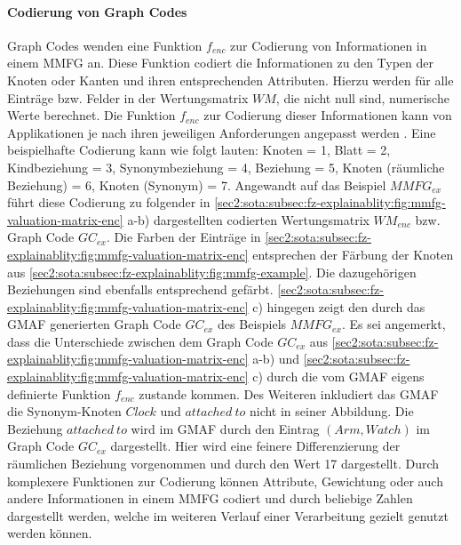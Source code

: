 \paragraph{Codierung von Graph Codes}
\label{sec2:sota:par:gc-encoding}
Graph Codes wenden eine Funktion $f_{enc}$ zur Codierung von Informationen in einem MMFG an.
Diese Funktion codiert die Informationen zu den Typen der Knoten oder Kanten und ihren entsprechenden Attributen.
Hierzu werden für alle Einträge bzw. Felder in der Wertungsmatrix $WM$, die nicht null sind, numerische Werte berechnet.
Die Funktion $f_{enc}$ zur Codierung dieser Informationen kann von Applikationen je nach ihren jeweiligen Anforderungen angepasst werden \cite{gc-2d-proj-mmfg}.
Eine beispielhafte Codierung kann wie folgt lauten: Knoten = 1, Blatt = 2, Kindbeziehung = 3, Synonymbeziehung = 4, Beziehung = 5, Knoten (räumliche Beziehung) = 6, Knoten (Synonym) = 7.
Angewandt auf das Beispiel $MMFG_{ex}$ führt diese Codierung zu folgender in \cref{sec2:sota:subsec:fz-explainablity:fig:mmfg-valuation-matrix-enc} a-b) dargestellten codierten Wertungsmatrix $WM_{enc}$ bzw. Graph Code $GC_{ex}$.
Die Farben der Einträge in \cref{sec2:sota:subsec:fz-explainablity:fig:mmfg-valuation-matrix-enc} entsprechen der Färbung der Knoten aus \cref{sec2:sota:subsec:fz-explainablity:fig:mmfg-example}.
Die dazugehörigen Beziehungen sind ebenfalls entsprechend gefärbt.
\cref{sec2:sota:subsec:fz-explainablity:fig:mmfg-valuation-matrix-enc} c) hingegen zeigt den durch das GMAF generierten Graph Code $GC_{ex}$ des Beispiels $MMFG_{ex}$.
Es sei angemerkt, dass die Unterschiede zwischen dem Graph Code $GC_{ex}$ aus \cref{sec2:sota:subsec:fz-explainablity:fig:mmfg-valuation-matrix-enc} a-b) und \cref{sec2:sota:subsec:fz-explainablity:fig:mmfg-valuation-matrix-enc} c) durch die vom GMAF eigens definierte Funktion $f_{enc}$ zustande kommen.
Des Weiteren inkludiert das GMAF die Synonym-Knoten $Clock$ und $attached~to$ nicht in seiner Abbildung.
Die Beziehung $attached~to$ wird im GMAF durch den Eintrag $(Arm,Watch)$ im Graph Code $GC_{ex}$ dargestellt.
Hier wird eine feinere Differenzierung der räumlichen Beziehung vorgenommen und durch den Wert 17 dargestellt.
Durch komplexere Funktionen zur Codierung können Attribute, Gewichtung oder auch andere Informationen in einem MMFG codiert und durch beliebige Zahlen dargestellt werden, welche im weiteren Verlauf einer Verarbeitung gezielt genutzt werden können.

